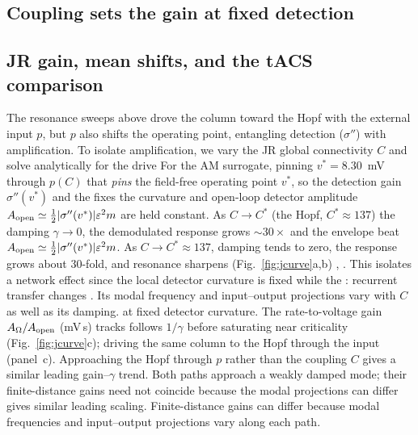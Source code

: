 \documentclass[11pt,a4paper]{article}
\newcommand{\Sig}{\sigma}
\newcommand{\half}{\tfrac{1}{2}}
\providecommand{\DIFaddtex}[1]{{\protect\color{blue} \sf #1}} %
\providecommand{\DIFdeltex}[1]{{\protect\color{red} \scriptsize #1}} %
\providecommand{\DIFaddbegin}{} %
\providecommand{\DIFaddend}{} %
\providecommand{\DIFdelbegin}{} %
\providecommand{\DIFdelend}{} %
\providecommand{\DIFadd}[1]{\texorpdfstring{\DIFaddtex{#1}}{#1}} %
\providecommand{\DIFdel}[1]{\texorpdfstring{\DIFdeltex{#1}}{}} %
\begin{document}
\subsection{\DIFdel{Coupling sets the gain at fixed detection}}%
\addtocounter{subsection}{-1}%
\DIFdelend \DIFaddbegin \subsection{\DIFadd{JR gain, mean shifts, and the tACS comparison}}\DIFaddend \label{sec:jcurve}
\DIFdelbegin \DIFdel{The resonance sweeps above drove the column toward the Hopf with
the external input
$p$, but $p$ also shifts the operating point, entangling detection ($\Sig''$) with
amplification. To isolate amplification, we vary the JR global connectivity $C$ and solve analytically for the
drive }\DIFdelend \DIFaddbegin \DIFadd{For the AM surrogate, pinning $v^*=8.30$~mV through }\DIFaddend $p(C)$ \DIFdelbegin \DIFdel{that
\emph{pins} the field-free operating point $v^*$, so the detection gain $\Sig''(v^*)$ and the
}\DIFdelend \DIFaddbegin \DIFadd{fixes the curvature and }\DIFaddend open-loop
\DIFdelbegin \DIFdel{detector amplitude $A_{\rm open}\simeq\half|\Sig''(v^*)|\varepsilon^2 m$ are held
constant.
As $C\!\to\!C^*$ (the Hopf, $C^*\!\approx\!137$) the damping
$\gamma\!\to\!0$, the demodulated response grows $\sim30\times$ and the envelope
}\DIFdelend \DIFaddbegin \DIFadd{beat $A_{\rm open}\simeq\half|\Sig''(v^*)|\varepsilon^2m$.
As $C\to C^*\approx137$, damping tends to zero, the response grows about
$30$-fold, and }\DIFaddend resonance sharpens (Fig.~\ref{fig:jcurve}a,b)\DIFdelbegin \DIFdel{, }\DIFdelend \DIFaddbegin \DIFadd{.
This isolates }\DIFaddend a network effect\DIFdelbegin \DIFdel{since
the local detector curvature is fixed while the }\DIFdelend \DIFaddbegin \DIFadd{: }\DIFaddend recurrent transfer changes \DIFdelbegin \DIFdel{. Its modal frequency and
input--output projections vary with $C$ as well as its damping. }\DIFdelend \DIFaddbegin \DIFadd{at fixed detector curvature.
}\DIFaddend The rate-to-voltage gain $A_\Omega/A_{\rm open}$ (mV\,s) \DIFdelbegin \DIFdel{tracks }\DIFdelend \DIFaddbegin \DIFadd{follows
}\DIFaddend $1/\gamma$ before saturating \DIFdelbegin \DIFdel{near criticality
(Fig.~\ref{fig:jcurve}c); driving the same column to the Hopf through the input }\DIFdelend \DIFaddbegin \DIFadd{(panel~c). Approaching the Hopf through }\DIFaddend $p$
\DIFdelbegin \DIFdel{rather than the coupling $C$ gives a similar leading gain--$\gamma$ trend. Both paths approach a weakly damped mode; their finite-distance gains need not
coincide because
the modal projections can differ}\DIFdelend \DIFaddbegin \DIFadd{gives similar leading scaling. Finite-distance gains can differ because
modal frequencies and input--output projections vary along each path}\DIFaddend .
\end{document}
